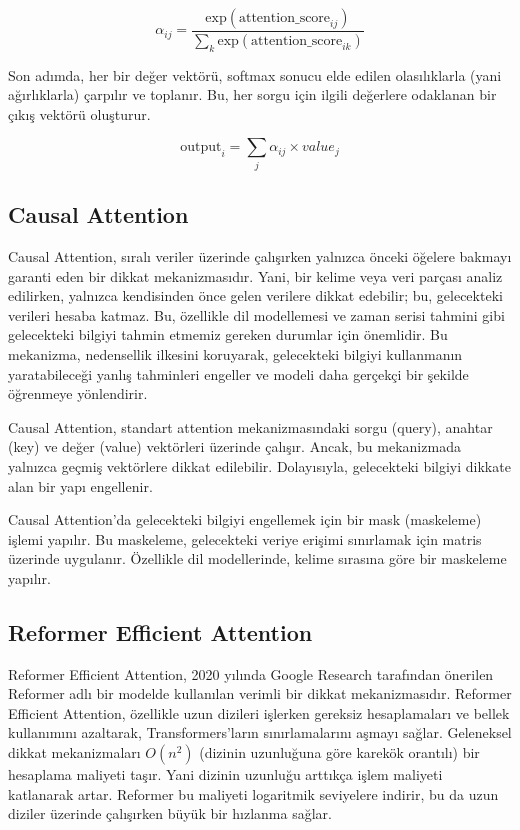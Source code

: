\[ \alpha_{ij} = \frac{\text{exp}(\text{attention\_score}_{ij})}{\sum_k \text{exp}(\text{attention\_score}_{ik})} \]

Son adımda, her bir değer vektörü, softmax sonucu elde edilen olasılıklarla (yani ağırlıklarla) çarpılır ve toplanır. Bu, her sorgu için ilgili değerlere odaklanan bir çıkış vektörü oluşturur.

\[ \text{output}_i = \sum_j \alpha_{ij} \times value_j \]

\newpage

\subsection{Causal Attention}

Causal Attention, sıralı veriler üzerinde çalışırken yalnızca önceki öğelere bakmayı garanti eden bir dikkat mekanizmasıdır. Yani, bir kelime veya veri parçası analiz edilirken, yalnızca kendisinden önce gelen verilere dikkat edebilir; bu, gelecekteki verileri hesaba katmaz. Bu, özellikle dil modellemesi ve zaman serisi tahmini gibi gelecekteki bilgiyi tahmin etmemiz gereken durumlar için önemlidir. Bu mekanizma, nedensellik ilkesini koruyarak, gelecekteki bilgiyi kullanmanın yaratabileceği yanlış tahminleri engeller ve modeli daha gerçekçi bir şekilde öğrenmeye yönlendirir. 

Causal Attention, standart attention mekanizmasındaki sorgu (query), anahtar (key) ve değer (value) vektörleri üzerinde çalışır. Ancak, bu mekanizmada yalnızca geçmiş vektörlere dikkat edilebilir. Dolayısıyla, gelecekteki bilgiyi dikkate alan bir yapı engellenir. 

Causal Attention'da gelecekteki bilgiyi engellemek için bir mask (maskeleme) işlemi yapılır. Bu maskeleme, gelecekteki veriye erişimi sınırlamak için matris üzerinde uygulanır. Özellikle dil modellerinde, kelime sırasına göre bir maskeleme yapılır.

\newpage

\subsection{Reformer Efficient Attention}

Reformer Efficient Attention, 2020 yılında Google Research tarafından önerilen Reformer adlı bir modelde kullanılan verimli bir dikkat mekanizmasıdır. Reformer Efficient Attention, özellikle uzun dizileri işlerken gereksiz hesaplamaları ve bellek kullanımını azaltarak, Transformers'ların sınırlamalarını aşmayı sağlar. Geleneksel dikkat mekanizmaları $O(n^2)$ (dizinin uzunluğuna göre karekök orantılı) bir hesaplama maliyeti taşır. Yani dizinin uzunluğu arttıkça işlem maliyeti katlanarak artar. Reformer bu maliyeti logaritmik seviyelere indirir, bu da uzun diziler üzerinde çalışırken büyük bir hızlanma sağlar.

